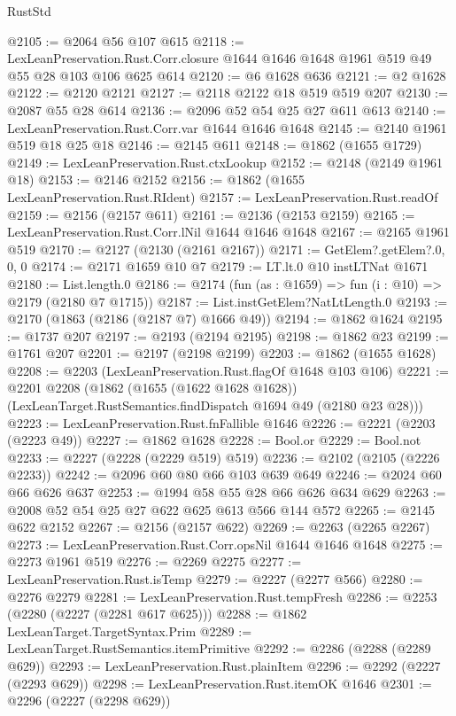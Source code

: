 \begin{lexlean}{RustStd}
\begin{coremodule}
@2105 := @2064 @56 @107 @615
@2118 := LexLeanPreservation.Rust.Corr.closure
    @1644
    @1646
    @1648
    @1961
    @519
    @49
    @55
    @28
    @103
    @106
    @625
    @614
@2120 := @6 @1628 @636
@2121 := @2 @1628
@2122 := @2120 @2121
@2127 := @2118 @2122 @18 @519 @519 @207
@2130 := @2087 @55 @28 @614
@2136 := @2096 @52 @54 @25 @27 @611 @613
@2140 := LexLeanPreservation.Rust.Corr.var @1644 @1646 @1648
@2145 := @2140 @1961 @519 @18 @25 @18
@2146 := @2145 @611
@2148 := @1862 (@1655 @1729)
@2149 := LexLeanPreservation.Rust.ctxLookup
@2152 := @2148 (@2149 @1961 @18)
@2153 := @2146 @2152
@2156 := @1862 (@1655 LexLeanPreservation.Rust.RIdent)
@2157 := LexLeanPreservation.Rust.readOf
@2159 := @2156 (@2157 @611)
@2161 := @2136 (@2153 @2159)
@2165 := LexLeanPreservation.Rust.Corr.lNil @1644 @1646 @1648
@2167 := @2165 @1961 @519
@2170 := @2127 (@2130 (@2161 @2167))
@2171 := GetElem?.getElem?.{0, 0, 0}
@2174 := @2171 @1659 @10 @7
@2179 := LT.lt.{0} @10 instLTNat @1671
@2180 := List.length.{0}
@2186 := @2174 (fun (as : @1659) => fun (i : @10) => @2179 (@2180 @7 @1715))
@2187 := List.instGetElem?NatLtLength.{0}
@2193 := @2170 (@1863 (@2186 (@2187 @7) @1666 @49))
@2194 := @1862 @1624
@2195 := @1737 @207
@2197 := @2193 (@2194 @2195)
@2198 := @1862 @23
@2199 := @1761 @207
@2201 := @2197 (@2198 @2199)
@2203 := @1862 (@1655 @1628)
@2208 := @2203 (LexLeanPreservation.Rust.flagOf @1648 @103 @106)
@2221 := @2201
    @2208
    (@1862
      (@1655 (@1622 @1628 @1628))
      (LexLeanTarget.RustSemantics.findDispatch @1694 @49 (@2180 @23 @28)))
@2223 := LexLeanPreservation.Rust.fnFallible @1646
@2226 := @2221 (@2203 (@2223 @49))
@2227 := @1862 @1628
@2228 := Bool.or
@2229 := Bool.not
@2233 := @2227 (@2228 (@2229 @519) @519)
@2236 := @2102 (@2105 (@2226 @2233))
@2242 := @2096 @60 @80 @66 @103 @639 @649
@2246 := @2024 @60 @66 @626 @637
@2253 := @1994 @58 @55 @28 @66 @626 @634 @629
@2263 := @2008 @52 @54 @25 @27 @622 @625 @613 @566 @144 @572
@2265 := @2145 @622 @2152
@2267 := @2156 (@2157 @622)
@2269 := @2263 (@2265 @2267)
@2273 := LexLeanPreservation.Rust.Corr.opsNil @1644 @1646 @1648
@2275 := @2273 @1961 @519
@2276 := @2269 @2275
@2277 := LexLeanPreservation.Rust.isTemp
@2279 := @2227 (@2277 @566)
@2280 := @2276 @2279
@2281 := LexLeanPreservation.Rust.tempFresh
@2286 := @2253 (@2280 (@2227 (@2281 @617 @625)))
@2288 := @1862 LexLeanTarget.TargetSyntax.Prim
@2289 := LexLeanTarget.RustSemantics.itemPrimitive
@2292 := @2286 (@2288 (@2289 @629))
@2293 := LexLeanPreservation.Rust.plainItem
@2296 := @2292 (@2227 (@2293 @629))
@2298 := LexLeanPreservation.Rust.itemOK @1646
@2301 := @2296 (@2227 (@2298 @629))

\end{coremodule}
\end{lexlean}
